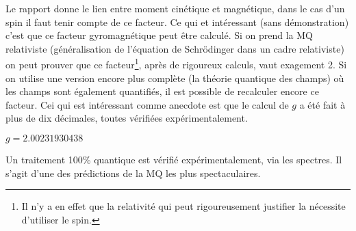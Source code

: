 	Le rapport donne le lien entre moment cinétique et magnétique, dans le 
	cas d'un spin il faut tenir compte de ce facteur. Ce qui et intéressant (sans 
	démonstration) c'est que ce facteur gyromagnétique peut être calculé. Si on 
	prend la MQ relativiste  (généralisation de l'équation de Schrödinger dans un 
	cadre relativiste) on peut prouver que ce facteur\footnote{Il n'y a en effet 
	que la relativité qui peut rigoureusement justifier la nécessite d'utiliser le spin.}, 
	après de rigoureux calculs, vaut exagement 2. Si on utilise une version encore 
	plus complète (la théorie quantique des champs) où les champs sont également quantifiés, 
	il est possible de recalculer encore ce facteur. Cei qui est intéressant comme 
	anecdote est que le calcul de $g$ a été fait à plus de dix décimales, toutes vérifiées 
	expérimentalement.
	\begin{center}
	$g = 2.00231930438$
	\end{center}
	Un traitement 100\% quantique est vérifié expérimentalement, via les spectres. Il 
	s'agit d'une des prédictions de la MQ les plus spectaculaires.
	

